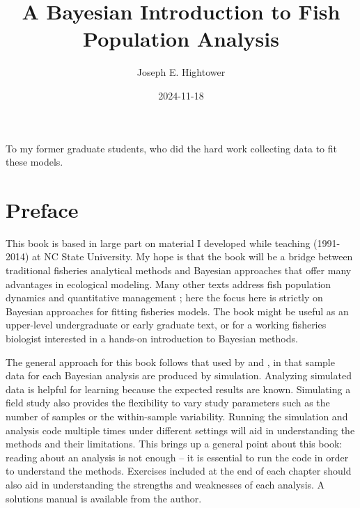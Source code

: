 \documentclass[
]{krantz}
\title{A Bayesian Introduction to Fish Population Analysis}
\author{Joseph E. Hightower}
\date{2024-11-18}
\begin{document}
\maketitle


\thispagestyle{empty}

\begin{center}
To my former graduate students,
who did the hard work collecting data to fit these models.
\end{center}

\setlength{\abovedisplayskip}{-5pt}
\setlength{\abovedisplayshortskip}{-5pt}

{
\hypersetup{linkcolor=}
\setcounter{tocdepth}{2}
\tableofcontents
}
\listoffigures
\hypertarget{preface}{%
\chapter*{Preface}\label{preface}}


This book is based in large part on material I developed while teaching (1991-2014) at NC State University. My hope is that the book will be a bridge between traditional fisheries analytical methods and Bayesian approaches that offer many advantages in ecological modeling. Many other texts address fish population dynamics and quantitative management \citep[e.g.,][]{hilborn.walters_1992, quinn.deriso_1999}; here the focus here is strictly on Bayesian approaches for fitting fisheries models. The book might be useful as an upper-level undergraduate or early graduate text, or for a working fisheries biologist interested in a hands-on introduction to Bayesian methods.

The general approach for this book follows that used by \citet{kéry_2010} and \citet{kéry.schaub_2011}, in that sample data for each Bayesian analysis are produced by simulation. Analyzing simulated data is helpful for learning because the expected results are known. Simulating a field study also provides the flexibility to vary study parameters such as the number of samples or the within-sample variability. Running the simulation and analysis code multiple times under different settings will aid in understanding the methods and their limitations. This brings up a general point about this book: reading about an analysis is not enough -- it is essential to run the code in order to understand the methods. Exercises included at the end of each chapter should also aid in understanding the strengths and weaknesses of each analysis. A solutions manual is available from the author.
\end{document}
